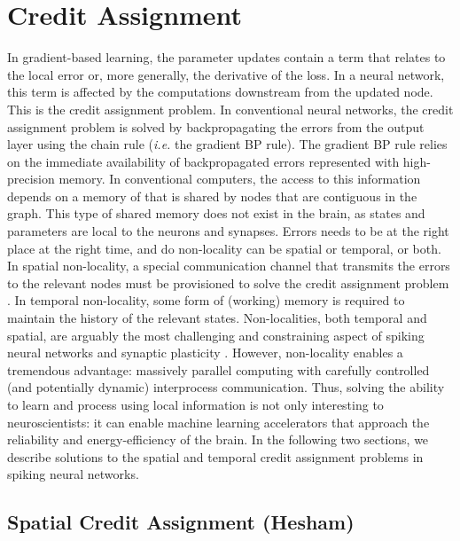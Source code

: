 \documentclass[journal,onecolumn,11pt]{IEEEtran}
\begin{document}
\section{Credit Assignment}
In gradient-based learning, the parameter updates contain a term that relates to the local error or, more generally, the derivative of the loss. In a neural network, this term is affected by the computations downstream from the updated node. This is the credit assignment problem. In conventional neural networks, the credit assignment problem is solved by backpropagating the errors from the output layer using the chain rule (\emph{i.e.} the gradient BP rule).
The gradient BP rule relies on the immediate availability of backpropagated errors represented with high-precision memory. In conventional computers, the access to this information depends on a memory of that is shared by nodes that are contiguous in the graph.
This type of shared memory does not exist in the brain, as states and parameters are local to the neurons and synapses.
Errors needs to be at the right place at the right time, and do non-locality can be spatial or temporal, or both.
In spatial non-locality, a special communication channel that transmits the errors to the relevant nodes must be provisioned to solve the credit assignment problem \cite{Baldi_Sadowski16_theoloca}. 
In temporal non-locality, some form of (working) memory is required to maintain the history of the relevant states. 
Non-localities, both temporal and spatial, are arguably the most challenging and constraining aspect of spiking neural networks and synaptic plasticity \cite{Neftci18_datapowe}. 
However, non-locality enables a tremendous advantage: massively parallel computing with carefully controlled (and potentially dynamic) interprocess communication. 
Thus, solving the ability to learn and process using local information is not only interesting to neuroscientists: it can enable machine learning accelerators that approach the reliability and energy-efficiency of the brain.
In the following two sections, we describe solutions to the spatial and temporal credit assignment problems in spiking neural networks.

\subsection{Spatial Credit Assignment (Hesham)}
\end{document}
